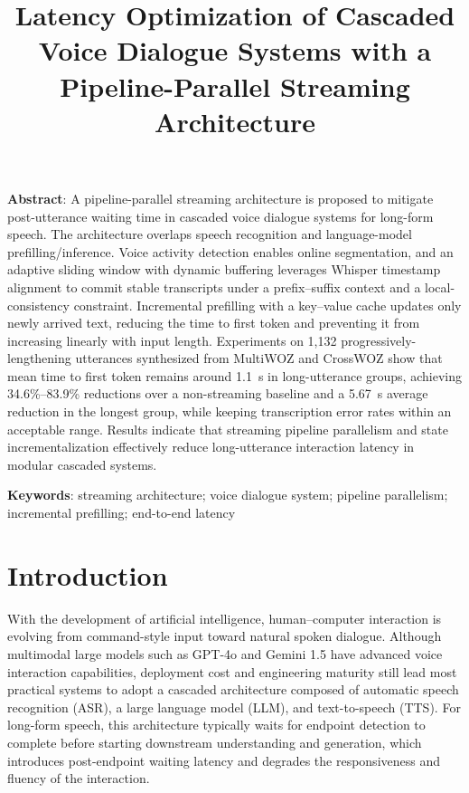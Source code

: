 \documentclass[a4paper,11pt]{article}
\title{Latency Optimization of Cascaded Voice Dialogue Systems with a Pipeline-Parallel Streaming Architecture}
\author{}
\date{}
\begin{document}
\maketitle

\noindent\textbf{Abstract}: A pipeline-parallel streaming architecture is proposed to mitigate post-utterance waiting time in cascaded voice dialogue systems for long-form speech. The architecture overlaps speech recognition and language-model prefilling/inference. Voice activity detection enables online segmentation, and an adaptive sliding window with dynamic buffering leverages Whisper timestamp alignment to commit stable transcripts under a prefix--suffix context and a local-consistency constraint. Incremental prefilling with a key--value cache updates only newly arrived text, reducing the time to first token and preventing it from increasing linearly with input length. Experiments on 1,132 progressively-lengthening utterances synthesized from MultiWOZ and CrossWOZ show that mean time to first token remains around 1.1~s in long-utterance groups, achieving 34.6\%--83.9\% reductions over a non-streaming baseline and a 5.67~s average reduction in the longest group, while keeping transcription error rates within an acceptable range. Results indicate that streaming pipeline parallelism and state incrementalization effectively reduce long-utterance interaction latency in modular cascaded systems.

\medskip
\noindent\textbf{Keywords}: streaming architecture; voice dialogue system; pipeline parallelism; incremental prefilling; end-to-end latency

\section{Introduction}

With the development of artificial intelligence, human--computer interaction is evolving from command-style input toward natural spoken dialogue. Although multimodal large models such as GPT-4o and Gemini 1.5 have advanced voice interaction capabilities, deployment cost and engineering maturity still lead most practical systems to adopt a cascaded architecture composed of automatic speech recognition (ASR), a large language model (LLM), and text-to-speech (TTS). For long-form speech, this architecture typically waits for endpoint detection to complete before starting downstream understanding and generation, which introduces post-endpoint waiting latency and degrades the responsiveness and fluency of the interaction.
\end{document}
